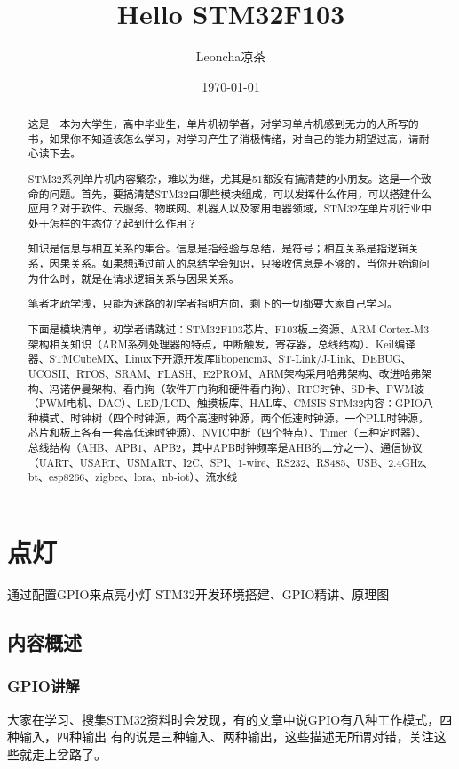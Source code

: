 \documentclass[UTF8]{ctexart}
\title{Hello STM32F103}
\author{Leoncha凉茶}
\date{\today}
\begin{document}
\maketitle
{}
\newpage

\begin{abstract}
这是一本为大学生，高中毕业生，单片机初学者，对学习单片机感到无力的人所写的书，如果你不知道该怎么学习，对学习产生了消极情绪，对自己的能力期望过高，请耐心读下去。

STM32系列单片机内容繁杂，难以为继，尤其是51都没有搞清楚的小朋友。这是一个致命的问题。首先，要搞清楚STM32由哪些模块组成，可以发挥什么作用，可以搭建什么应用？对于软件、云服务、物联网、机器人以及家用电器领域，STM32在单片机行业中处于怎样的生态位？起到什么作用？

知识是信息与相互关系的集合。信息是指经验与总结，是符号；相互关系是指逻辑关系，因果关系。如果想通过前人的总结学会知识，只接收信息是不够的，当你开始询问为什么时，就是在请求逻辑关系与因果关系。

笔者才疏学浅，只能为迷路的初学者指明方向，剩下的一切都要大家自己学习。

下面是模块清单，初学者请跳过：STM32F103芯片、F103板上资源、ARM Cortex-M3架构相关知识（ARM系列处理器的特点，中断触发，寄存器，总线结构）、Keil编译器、STMCubeMX、Linux下开源开发库libopencm3、ST-Link/J-Link、DEBUG、UCOSII、RTOS、SRAM、FLASH、E2PROM、ARM架构采用哈弗架构、改进哈弗架构、冯诺伊曼架构、看门狗（软件开门狗和硬件看门狗）、RTC时钟、SD卡、PWM波（PWM电机、DAC）、LED/LCD、触摸板库、HAL库、CMSIS
STM32内容：GPIO八种模式、时钟树（四个时钟源，两个高速时钟源，两个低速时钟源，一个PLL时钟源，芯片和板上各有一套高低速时钟源）、NVIC中断（四个特点）、Timer（三种定时器）、总线结构（AHB、APB1、APB2，其中APB时钟频率是AHB的二分之一）、通信协议（UART、USART、USMART、I2C、SPI、1-wire、RS232、RS485、USB、2.4GHz、bt、esp8266、zigbee、lora、nb-iot）、流水线
\end{abstract}



\section{点灯}
通过配置GPIO来点亮小灯
STM32开发环境搭建、GPIO精讲、原理图
\subsection{内容概述}
\subsubsection{GPIO讲解}
大家在学习、搜集STM32资料时会发现，有的文章中说GPIO有八种工作模式，四种输入，四种输出
有的说是三种输入、两种输出，这些描述无所谓对错，关注这些就走上岔路了。
\end{document}
